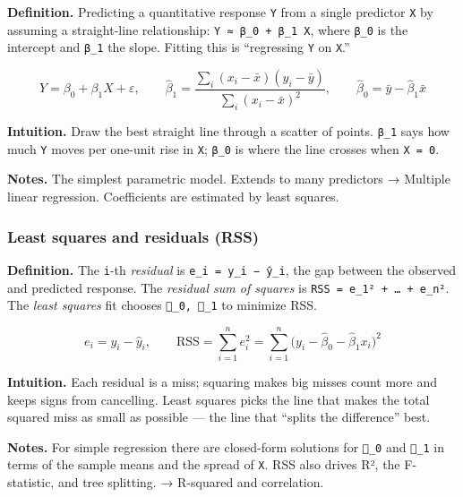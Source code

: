 \documentclass[
  10pt,
  letterpaper,
  onecolumn]{article}
\begin{document}
\textbf{Definition.} Predicting a quantitative response \texttt{Y} from
a single predictor \texttt{X} by assuming a straight-line relationship:
\texttt{Y\ ≈\ β\_0\ +\ β\_1\ X}, where \texttt{β\_0} is the intercept
and \texttt{β\_1} the slope. Fitting this is ``regressing \texttt{Y} on
\texttt{X}.''

\begin{equation*}
Y=\beta_0+\beta_1X+\varepsilon,
\qquad
\hat\beta_1=\frac{\sum_i (x_i-\bar x)(y_i-\bar y)}{\sum_i (x_i-\bar x)^2},
\qquad
\hat\beta_0=\bar y-\hat\beta_1\bar x
\end{equation*}

\textbf{Intuition.} Draw the best straight line through a scatter of
points. \texttt{β\_1} says how much \texttt{Y} moves per one-unit rise
in \texttt{X}; \texttt{β\_0} is where the line crosses when
\texttt{X\ =\ 0}.

\textbf{Notes.} The simplest parametric model. Extends to many
predictors → Multiple linear regression. Coefficients are estimated by
least squares.

\hypertarget{least-squares-and-residuals-rss}{%
\subsubsection{Least squares and residuals
(RSS)}\label{least-squares-and-residuals-rss}}

\textbf{Definition.} The \texttt{i}-th \emph{residual} is
\texttt{e\_i\ =\ y\_i\ −\ ŷ\_i}, the gap between the observed and
predicted response. The \emph{residual sum of squares} is
\texttt{RSS\ =\ e\_1²\ +\ …\ +\ e\_n²}. The \emph{least squares} fit
chooses \texttt{\_0,\ \_1} to minimize RSS.

\begin{equation*}
e_i=y_i-\hat y_i,
\qquad
\mathrm{RSS}=\sum_{i=1}^{n}e_i^2=\sum_{i=1}^{n}\bigl(y_i-\hat\beta_0-\hat\beta_1x_i\bigr)^2
\end{equation*}

\textbf{Intuition.} Each residual is a miss; squaring makes big misses
count more and keeps signs from cancelling. Least squares picks the line
that makes the total squared miss as small as possible --- the line that
``splits the difference'' best.

\textbf{Notes.} For simple regression there are closed-form solutions
for \texttt{\_0} and \texttt{\_1} in terms of the sample means and the
spread of \texttt{X}. RSS also drives R², the F-statistic, and tree
splitting. → R-squared and correlation.
\end{document}
